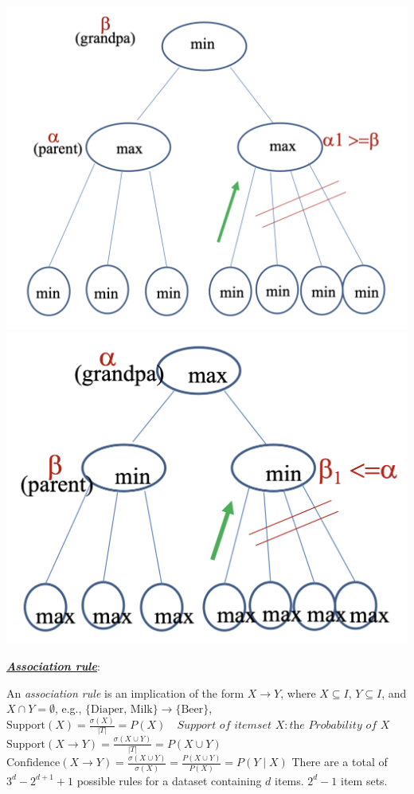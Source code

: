 \documentclass[12pt]{article}
\newcommand{\bulletPoint}[1]{\ul{\textit{\textbf{#1}}}}
\begin{document}
\begin{multicols*}{2}
\includegraphics[scale=0.17]{images/alpha-beta.png}
\includegraphics[scale=0.16]{images/beta-alpha.png}

\bulletPoint{Association rule}:

An \textit{association rule} is an implication of the form \( X \rightarrow Y \), where \( X \subseteq I \), \( Y \subseteq I \), and \( X \cap Y = \emptyset \), e.g., \(\{ \text{Diaper, Milk} \} \rightarrow \{ \text{Beer} \}\),
$\text{Support}(X) = \frac{\sigma(X)}{|T|} = P(X) \quad \textit{Support of itemset } X: \textit{the Probability of } X$
$\text{Support}(X \rightarrow Y) = \frac{\sigma(X \cup Y)}{|T|} = P(X \cup Y)$
$\text{Confidence}(X \rightarrow Y) = \frac{\sigma(X \cup Y)}{\sigma(X)} = \frac{P(X \cup Y)}{P(X)} = P(Y \mid X)$
There are a total of $3^d - 2^{d + 1} + 1$ possible rules for a dataset 
containing $d$ items. $2^{d}-1$  item sets. 


\end{multicols*}
\end{document}
